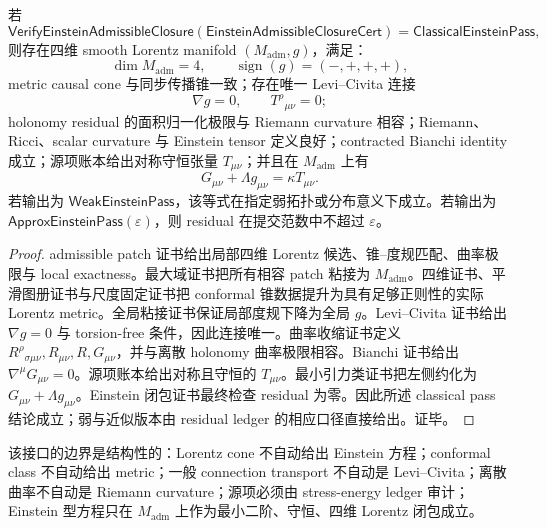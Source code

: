\begin{theorem}\label{thm:typed-address-biaxial-completion-admissible-einstein-closure-soundness}
若
\[
\mathsf{VerifyEinsteinAdmissibleClosure}
(\mathsf{EinsteinAdmissibleClosureCert})
=
\mathsf{ClassicalEinsteinPass},
\]
则存在四维 smooth Lorentz manifold \((M_{\mathrm{adm}},g)\)，满足：
\[
\dim M_{\mathrm{adm}}=4,
\qquad
\operatorname{sign}(g)=(-,+,+,+),
\]
metric causal cone 与同步传播锥一致；存在唯一 Levi--Civita 连接
\[
\nabla g=0,\qquad
T^\rho{}_{\mu\nu}=0;
\]
holonomy residual 的面积归一化极限与 Riemann curvature 相容；Riemann、Ricci、scalar curvature 与 Einstein tensor 定义良好；contracted Bianchi identity 成立；源项账本给出对称守恒张量 \(T_{\mu\nu}\)；并且在 \(M_{\mathrm{adm}}\) 上有
\[
\boxed{
G_{\mu\nu}+\Lambda g_{\mu\nu}
=
\kappa T_{\mu\nu}.
}
\]
若输出为 \(\mathsf{WeakEinsteinPass}\)，该等式在指定弱拓扑或分布意义下成立。若输出为 \(\mathsf{ApproxEinsteinPass}(\varepsilon)\)，则 residual 在提交范数中不超过 \(\varepsilon\)。
\end{theorem}
\begin{proof}
admissible patch 证书给出局部四维 Lorentz 候选、锥--度规匹配、曲率极限与 local exactness。最大域证书把所有相容 patch 粘接为 \(M_{\mathrm{adm}}\)。四维证书、平滑图册证书与尺度固定证书把 conformal 锥数据提升为具有足够正则性的实际 Lorentz metric。全局粘接证书保证局部度规下降为全局 \(g\)。Levi--Civita 证书给出 \(\nabla g=0\) 与 torsion-free 条件，因此连接唯一。曲率收缩证书定义 \(R^\rho{}_{\sigma\mu\nu},R_{\mu\nu},R,G_{\mu\nu}\)，并与离散 holonomy 曲率极限相容。Bianchi 证书给出 \(\nabla^\mu G_{\mu\nu}=0\)。源项账本给出对称且守恒的 \(T_{\mu\nu}\)。最小引力类证书把左侧约化为 \(G_{\mu\nu}+\Lambda g_{\mu\nu}\)。Einstein 闭包证书最终检查 residual 为零。因此所述 classical pass 结论成立；弱与近似版本由 residual ledger 的相应口径直接给出。证毕。
\end{proof}

该接口的边界是结构性的：Lorentz cone 不自动给出 Einstein 方程；conformal class 不自动给出 metric；一般 connection transport 不自动是 Levi--Civita；离散曲率不自动是 Riemann curvature；源项必须由 stress-energy ledger 审计；Einstein 型方程只在 \(M_{\mathrm{adm}}\) 上作为最小二阶、守恒、四维 Lorentz 闭包成立。
